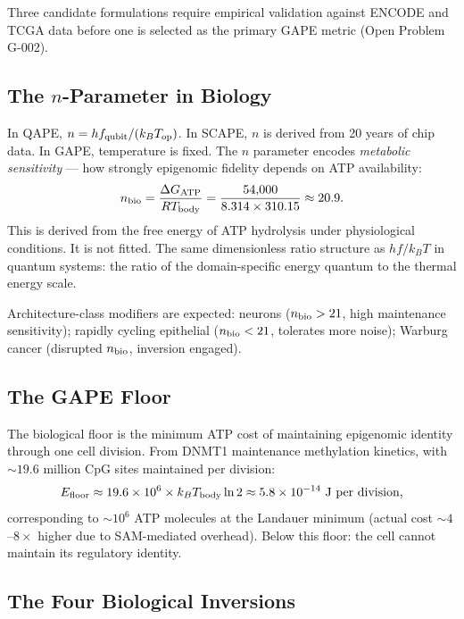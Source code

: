 \documentclass[12pt,a4paper]{article}
\begin{document}
Three candidate formulations require empirical validation against ENCODE
and TCGA data before one is selected as the primary GAPE metric
(Open Problem G-002).

\subsection{The $n$-Parameter in Biology}

In QAPE, $n = hf_{\rm qubit}/(k_B T_{\rm op})$.
In SCAPE, $n$ is derived from 20 years of chip data.
In GAPE, temperature is fixed. The $n$ parameter encodes
\emph{metabolic sensitivity} --- how strongly epigenomic fidelity
depends on ATP availability:
\begin{equation}
n_{\rm bio} = \frac{\Delta G_{\rm ATP}}{R T_{\rm body}}
= \frac{54{,}000}{8.314 \times 310.15} \approx 20.9.
\label{eq:nbio}
\end{equation}
This is derived from the free energy of ATP hydrolysis under physiological
conditions. It is not fitted. The same dimensionless ratio structure
as $hf/k_B T$ in quantum systems: the ratio of the domain-specific
energy quantum to the thermal energy scale.

Architecture-class modifiers are expected:
neurons ($n_{\rm bio} > 21$, high maintenance sensitivity);
rapidly cycling epithelial ($n_{\rm bio} < 21$, tolerates more noise);
Warburg cancer (disrupted $n_{\rm bio}$, inversion engaged).

\subsection{The GAPE Floor}

The biological floor is the minimum ATP cost of maintaining epigenomic
identity through one cell division. From DNMT1 maintenance methylation
kinetics, with $\sim 19.6$ million CpG sites maintained per division:
\begin{equation}
E_{\rm floor} \approx 19.6\times 10^6 \times k_B T_{\rm body}\ln 2
\approx 5.8\times 10^{-14}~\text{J per division,}
\end{equation}
corresponding to $\sim 10^6$ ATP molecules at the Landauer minimum
(actual cost $\sim 4$--$8\times$ higher due to SAM-mediated overhead).
Below this floor: the cell cannot maintain its regulatory identity.

\subsection{The Four Biological Inversions}
\label{subsec:four_inversions}
\end{document}
